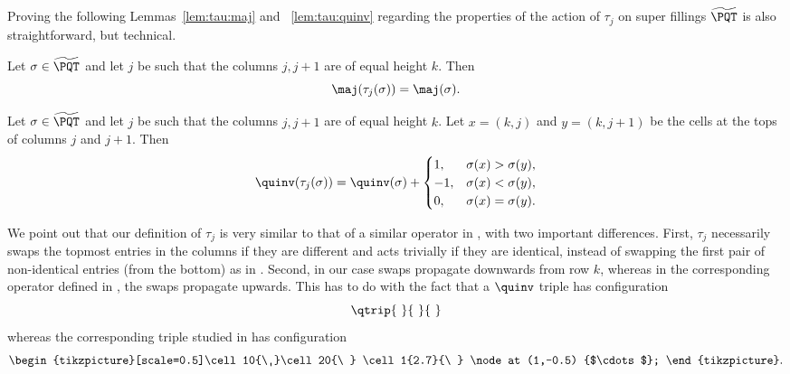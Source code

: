 Proving the following Lemmas~\ref{lem:tau:maj} and ~\ref{lem:tau:quinv} regarding the properties of the action of $\tau_j$ on super fillings $\widetilde{\PQT}$ is also straightforward, but technical.


\begin{lemma}\label{lem:tau:maj}
Let $\sigma\in\widetilde{\PQT}$ and let $j$ be such that the columns $j,j+1$ are of equal height $k$. Then 
\begin{equation}
\maj(\tau_j(\sigma))=\maj(\sigma).
\end{equation}
\end{lemma}

\begin{lemma}\label{lem:tau:quinv}
Let $\sigma\in\widetilde{\PQT}$ and let $j$ be such that the columns $j,j+1$ are of equal height $k$. Let $x=(k,j)$ and $y=(k,j+1)$ be the cells at the tops of columns $j$ and $j+1$. Then
\begin{equation}
\quinv(\tau_j(\sigma))=\quinv(\sigma) + \begin{cases} 1,& \sigma(x)>\sigma(y),\\
-1,&\sigma(x)<\sigma(y),\\
0,&\sigma(x)=\sigma(y). \end{cases}
\end{equation}
\end{lemma}

\begin{remark}
We point out that our definition of $\tau_j$ is very similar to that of a similar operator in \cite[Definition 3.7]{compactformula}, with two important differences. First, $\tau_j$ necessarily swaps the topmost entries in the columns if they are different and acts trivially if they are identical, instead of swapping the first pair of non-identical entries (from the bottom) as in \cite{compactformula}. Second, in our case swaps propagate downwards from row $k$, whereas in the corresponding operator defined in \cite{compactformula}, the swaps propagate upwards. This has to do with the fact that a $\quinv$ triple has configuration 
\[
\qtrip{\ }{\ }{\ }
\]
whereas the corresponding triple studied in \cite{compactformula} has configuration 
\[
\begin{tikzpicture}[scale=0.5]\cell10{\ }\cell20{\ } \cell1{2.7}{\ }
\node at (1,-0.5) {$\cdots$};
\end{tikzpicture}.
\]
\end{remark}

